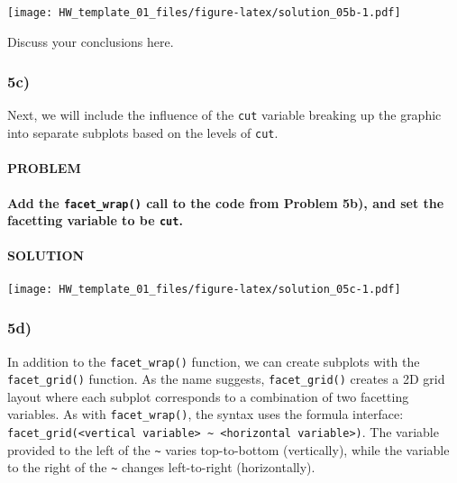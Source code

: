 \documentclass[]{article}
\newenvironment{Shaded}{\begin{snugshade}}{\end{snugshade}}
\newcommand{\DataTypeTok}[1]{\textcolor[rgb]{0.13,0.29,0.53}{#1}}
\newcommand{\KeywordTok}[1]{\textcolor[rgb]{0.13,0.29,0.53}{\textbf{#1}}}
\newcommand{\NormalTok}[1]{#1}
\newcommand{\OperatorTok}[1]{\textcolor[rgb]{0.81,0.36,0.00}{\textbf{#1}}}
\newcommand{\StringTok}[1]{\textcolor[rgb]{0.31,0.60,0.02}{#1}}
\let\oldparagraph\paragraph
\renewcommand{\paragraph}[1]{\oldparagraph{#1}\mbox{}}
\begin{document}
\texttt{[image: HW\_template\_01\_files/figure-latex/solution\_05b-1.pdf]}

Discuss your conclusions here.

\hypertarget{c-4}{%
\subsubsection{5c)}\label{c-4}}

Next, we will include the influence of the \texttt{cut} variable
breaking up the graphic into separate subplots based on the levels of
\texttt{cut}.

\hypertarget{problem-26}{%
\paragraph{PROBLEM}\label{problem-26}}

\textbf{Add the \texttt{facet\_wrap()} call to the code from Problem
5b), and set the facetting variable to be \texttt{cut}.}

\hypertarget{solution-25}{%
\paragraph{SOLUTION}\label{solution-25}}

\begin{Shaded}
\end{Shaded}

\texttt{[image: HW\_template\_01\_files/figure-latex/solution\_05c-1.pdf]}

\hypertarget{d-4}{%
\subsubsection{5d)}\label{d-4}}

In addition to the \texttt{facet\_wrap()} function, we can create
subplots with the \texttt{facet\_grid()} function. As the name suggests,
\texttt{facet\_grid()} creates a 2D grid layout where each subplot
corresponds to a combination of two facetting variables. As with
\texttt{facet\_wrap()}, the syntax uses the formula interface:
\texttt{facet\_grid(\textless{}vertical\ variable\textgreater{}\ \textasciitilde{}\ \textless{}horizontal\ variable\textgreater{})}.
The variable provided to the left of the \texttt{\textasciitilde{}}
varies top-to-bottom (vertically), while the variable to the right of
the \texttt{\textasciitilde{}} changes left-to-right (horizontally).
\end{document}
